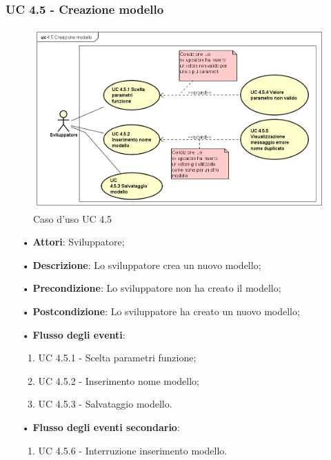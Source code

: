 \subsubsection{UC 4.5 - Creazione modello}
\begin{figure}[H]
\centering
\includegraphics[width=17cm]{img/UC450.png} 
\caption{Caso d'uso UC 4.5}\label{fig:450}
\end{figure}
\begin{itemize}
\item[•]\textbf{Attori}: Sviluppatore;
\item[•]\textbf{Descrizione}: Lo sviluppatore crea un nuovo modello;
\item[•]\textbf{Precondizione}: Lo sviluppatore non ha creato il modello;
\item[•]\textbf{Postcondizione}: Lo sviluppatore ha creato un nuovo modello;
\item[•]\textbf{Flusso degli eventi}:  
\begin{enumerate}
	\item UC 4.5.1 - Scelta parametri funzione;
	\item UC 4.5.2 - Inserimento nome modello;
	\item UC 4.5.3 - Salvataggio modello.
\end{enumerate}
\item[•]\textbf{Flusso degli eventi secondario}:  
\begin{enumerate}
	\item UC 4.5.6 - Interruzione inserimento modello.
\end{enumerate}
\end{itemize}

